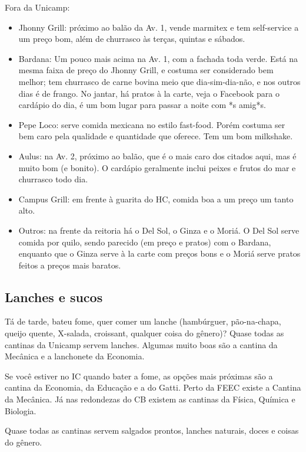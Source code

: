 Fora da Unicamp:

\begin{itemize}
\item Jhonny Grill: próximo ao balão da Av. 1, vende marmitex e tem
  self-service a um preço bom, além de churrasco às terças, quintas e sábados.
\item Bardana: Um pouco mais acima na Av. 1, com a fachada toda verde. Está na
  mesma faixa de preço do Jhonny Grill, e costuma ser considerado bem melhor;
  tem churrasco de carne bovina meio que dia-sim-dia-não, e nos outros dias é
  de frango. No jantar, há pratos à la carte, veja o Facebook para o cardápio
  do dia, é um bom lugar para passar a noite com *s amig*s.
\item Pepe Loco: serve comida mexicana no estilo fast-food. Porém costuma ser
  bem caro pela qualidade e quantidade que oferece. Tem um bom milkshake.
\item Aulus: na Av. 2, próximo ao balão, que é o mais caro dos citados aqui,
  mas é muito bom (e bonito). O cardápio geralmente inclui peixes e frutos do
  mar e churrasco todo dia.
\item Campus Grill: em frente à guarita do HC, comida boa a um preço um tanto
  alto.
\item Outros: na frente da reitoria há o Del Sol, o Ginza e o Moriá. O Del
  Sol serve comida por quilo, sendo parecido (em preço e pratos) com o Bardana,
  enquanto que o Ginza serve à la carte com preços bons e o Moriá serve pratos
  feitos a preços mais baratos.
\end{itemize}

\subsection{Lanches e sucos}

Tá de tarde, bateu fome, quer comer um lanche (hambúrguer, pão-na-chapa, queijo
quente, X-salada, croissant, qualquer coisa do gênero)? Quase todas as cantinas
da Unicamp servem lanches. Algumas muito boas são a cantina da Mecânica e a
lanchonete da Economia.

Se você estiver no IC quando bater a fome, as opções mais próximas são a
cantina da Economia, da Educação e a do Gatti. Perto da FEEC existe a Cantina
da Mecânica. Já nas redondezas do CB existem as cantinas da Física, Química e
Biologia.

Quase todas as cantinas servem salgados prontos, lanches naturais, doces e
coisas do gênero.

